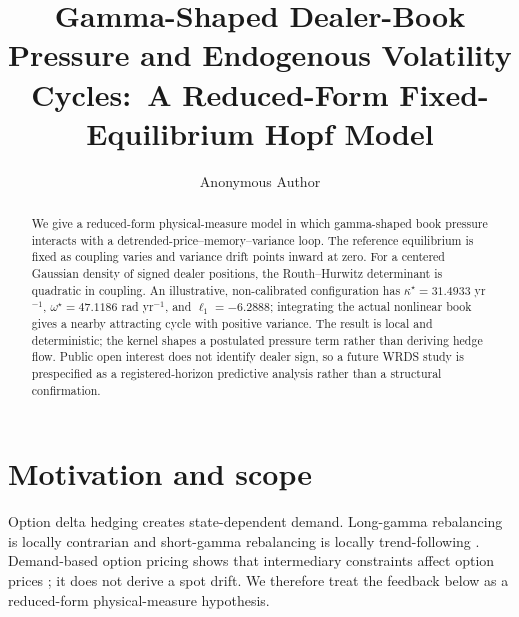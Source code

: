 \documentclass[sigconf,review,anonymous]{acmart}
\begin{document}
\title{Gamma-Shaped Dealer-Book Pressure and Endogenous Volatility Cycles:\
A Reduced-Form Fixed-Equilibrium Hopf Model}
\author{Anonymous Author}
\email{anonymous@example.org}

\begin{abstract}
We give a reduced-form physical-measure model in which gamma-shaped book
pressure interacts with a detrended-price--memory--variance loop. The
reference equilibrium is fixed as coupling varies and variance drift points
inward at zero. For a centered Gaussian density of signed dealer positions,
the Routh--Hurwitz determinant is quadratic in coupling. An illustrative,
non-calibrated configuration has $\kappa^\star=31.4933$ yr$^{-1}$,
$\omega^\star=47.1186$ rad yr$^{-1}$, and $\ell_1=-6.2888$; integrating the
actual nonlinear book gives a nearby attracting cycle with positive variance.
The result is local and deterministic; the kernel shapes a postulated pressure
term rather than deriving hedge flow. Public open interest does not identify
dealer sign, so a future WRDS study is prespecified as a registered-horizon
predictive analysis rather than a structural confirmation.
\end{abstract}

\maketitle

\section{Motivation and scope}

Option delta hedging creates state-dependent demand. Long-gamma rebalancing is
locally contrarian and short-gamma rebalancing is locally trend-following
\citep{freystremme1997,sircarpapanicolaou1998,platenschweizer1998}. Demand-based
option pricing shows that intermediary constraints affect option prices
\citep{garleanu2009demand}; it does not derive a spot drift. We therefore treat
the feedback below as a reduced-form physical-measure hypothesis.
\end{document}
